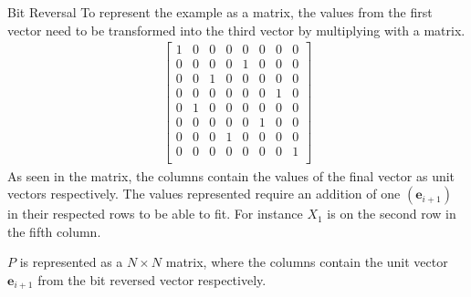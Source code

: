 \begin{example}{Bit Reversal}
    To represent the example as a matrix, the values from the first vector need to be transformed into the third vector by multiplying with a matrix.
    \begin{align*}
        \begin{bmatrix}
            1 & 0 & 0 & 0 & 0 & 0 & 0 & 0\\
            0 & 0 & 0 & 0 & 1 & 0 & 0 & 0\\
            0 & 0 & 1 & 0 & 0 & 0 & 0 & 0\\
            0 & 0 & 0 & 0 & 0 & 0 & 1 & 0\\
            0 & 1 & 0 & 0 & 0 & 0 & 0 & 0\\
            0 & 0 & 0 & 0 & 0 & 1 & 0 & 0\\
            0 & 0 & 0 & 1 & 0 & 0 & 0 & 0\\
            0 & 0 & 0 & 0 & 0 & 0 & 0 & 1\\
        \end{bmatrix}
    \end{align*}
    As seen in the matrix, the columns contain the values of the final vector as unit vectors respectively. The values represented require an addition of one $\left(\mathbf{e}_{i+1}\right)$ in their respected rows to be able to fit. For instance $X_1$ is on the second row in the fifth column.
\end{example}
$P$ is represented as a $N \times N$ matrix, where the columns contain the unit vector $\mathbf{e}_{i+1}$ from the bit reversed vector respectively.